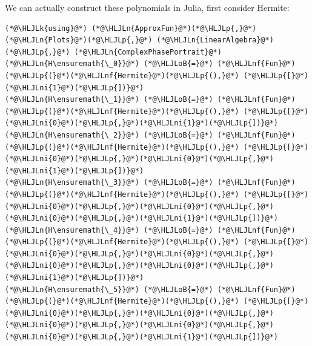 \documentclass[12pt,a4paper]{article}
\newcommand{\HLJLk}[1]{\textcolor[RGB]{148,91,176}{\textbf{#1}}}
\newcommand{\HLJLn}[1]{#1}
\newcommand{\HLJLnf}[1]{\textcolor[RGB]{66,102,213}{#1}}
\newcommand{\HLJLni}[1]{\textcolor[RGB]{59,151,46}{#1}}
\newcommand{\HLJLoB}[1]{\textcolor[RGB]{102,102,102}{\textbf{#1}}}
\newcommand{\HLJLp}[1]{#1}
\begin{document}
We can actually construct these polynomials in Julia, first consider Hermite:


\begin{lstlisting}
(*@\HLJLk{using}@*) (*@\HLJLn{ApproxFun}@*)(*@\HLJLp{,}@*) (*@\HLJLn{Plots}@*)(*@\HLJLp{,}@*) (*@\HLJLn{LinearAlgebra}@*)(*@\HLJLp{,}@*) (*@\HLJLn{ComplexPhasePortrait}@*)
(*@\HLJLn{H\ensuremath{\_0}}@*) (*@\HLJLoB{=}@*) (*@\HLJLnf{Fun}@*)(*@\HLJLp{(}@*)(*@\HLJLnf{Hermite}@*)(*@\HLJLp{(),}@*) (*@\HLJLp{[}@*)(*@\HLJLni{1}@*)(*@\HLJLp{])}@*)
(*@\HLJLn{H\ensuremath{\_1}}@*) (*@\HLJLoB{=}@*) (*@\HLJLnf{Fun}@*)(*@\HLJLp{(}@*)(*@\HLJLnf{Hermite}@*)(*@\HLJLp{(),}@*) (*@\HLJLp{[}@*)(*@\HLJLni{0}@*)(*@\HLJLp{,}@*)(*@\HLJLni{1}@*)(*@\HLJLp{])}@*)
(*@\HLJLn{H\ensuremath{\_2}}@*) (*@\HLJLoB{=}@*) (*@\HLJLnf{Fun}@*)(*@\HLJLp{(}@*)(*@\HLJLnf{Hermite}@*)(*@\HLJLp{(),}@*) (*@\HLJLp{[}@*)(*@\HLJLni{0}@*)(*@\HLJLp{,}@*)(*@\HLJLni{0}@*)(*@\HLJLp{,}@*)(*@\HLJLni{1}@*)(*@\HLJLp{])}@*)
(*@\HLJLn{H\ensuremath{\_3}}@*) (*@\HLJLoB{=}@*) (*@\HLJLnf{Fun}@*)(*@\HLJLp{(}@*)(*@\HLJLnf{Hermite}@*)(*@\HLJLp{(),}@*) (*@\HLJLp{[}@*)(*@\HLJLni{0}@*)(*@\HLJLp{,}@*)(*@\HLJLni{0}@*)(*@\HLJLp{,}@*)(*@\HLJLni{0}@*)(*@\HLJLp{,}@*)(*@\HLJLni{1}@*)(*@\HLJLp{])}@*)
(*@\HLJLn{H\ensuremath{\_4}}@*) (*@\HLJLoB{=}@*) (*@\HLJLnf{Fun}@*)(*@\HLJLp{(}@*)(*@\HLJLnf{Hermite}@*)(*@\HLJLp{(),}@*) (*@\HLJLp{[}@*)(*@\HLJLni{0}@*)(*@\HLJLp{,}@*)(*@\HLJLni{0}@*)(*@\HLJLp{,}@*)(*@\HLJLni{0}@*)(*@\HLJLp{,}@*)(*@\HLJLni{0}@*)(*@\HLJLp{,}@*)(*@\HLJLni{1}@*)(*@\HLJLp{])}@*)
(*@\HLJLn{H\ensuremath{\_5}}@*) (*@\HLJLoB{=}@*) (*@\HLJLnf{Fun}@*)(*@\HLJLp{(}@*)(*@\HLJLnf{Hermite}@*)(*@\HLJLp{(),}@*) (*@\HLJLp{[}@*)(*@\HLJLni{0}@*)(*@\HLJLp{,}@*)(*@\HLJLni{0}@*)(*@\HLJLp{,}@*)(*@\HLJLni{0}@*)(*@\HLJLp{,}@*)(*@\HLJLni{0}@*)(*@\HLJLp{,}@*)(*@\HLJLni{0}@*)(*@\HLJLp{,}@*)(*@\HLJLni{1}@*)(*@\HLJLp{])}@*)


\end{lstlisting}
\end{document}
